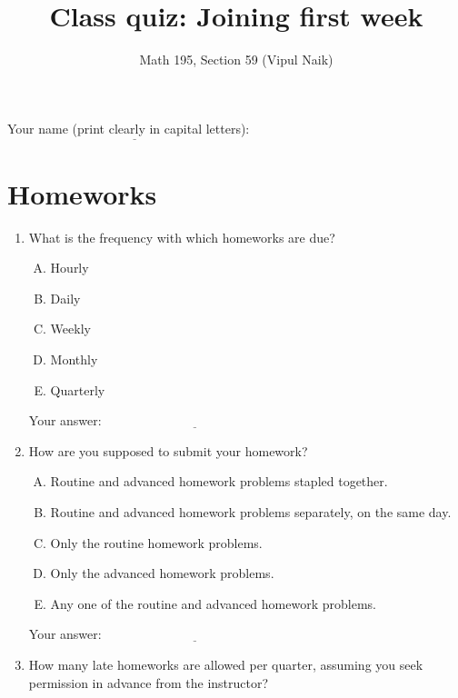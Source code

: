 \documentclass[10pt]{amsart}
\title{Class quiz: Joining first week}
\author{Math 195, Section 59 (Vipul Naik)}
\begin{document}
\maketitle

Your name (print clearly in capital letters): $\underline{\qquad\qquad\qquad\qquad\qquad\qquad\qquad\qquad\qquad\qquad}$

\section{Homeworks}

\begin{enumerate}
\item What is the frequency with which homeworks are due?

  \begin{enumerate}[(A)]
  \item Hourly
  \item Daily
  \item Weekly
  \item Monthly
  \item Quarterly
  \end{enumerate}

  \vspace{0.1in}
  Your answer: $\underline{\qquad\qquad\qquad\qquad\qquad\qquad\qquad}$
  \vspace{0.1in}

\item How are you supposed to submit your homework?

  \begin{enumerate}[(A)]
  \item Routine and advanced homework problems stapled together.
  \item Routine and advanced homework problems separately, on the same
    day.
  \item Only the routine homework problems.
  \item Only the advanced homework problems.
  \item Any one of the routine and advanced homework problems.
  \end{enumerate}

  \vspace{0.1in}
  Your answer: $\underline{\qquad\qquad\qquad\qquad\qquad\qquad\qquad}$
  \vspace{0.1in}

\item How many late homeworks are allowed per quarter, assuming you
  seek permission in advance from the instructor?


\end{enumerate}
\end{document}
